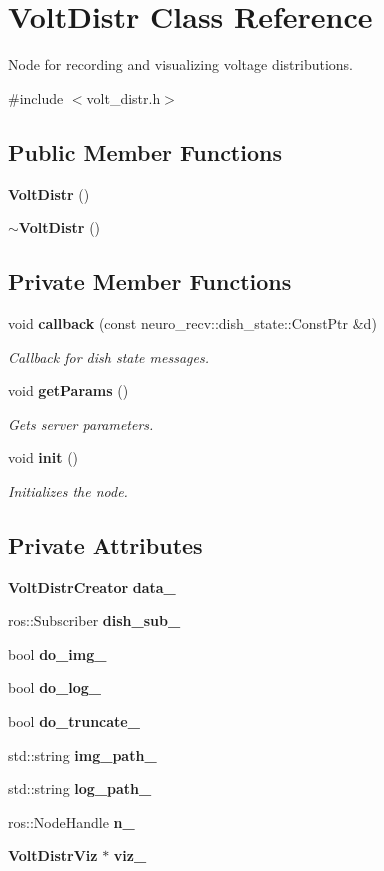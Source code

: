 \section{\-Volt\-Distr \-Class \-Reference}
\label{classVoltDistr}


\-Node for recording and visualizing voltage distributions.  




{\ttfamily \#include $<$volt\-\_\-distr.\-h$>$}

\subsection*{\-Public \-Member \-Functions}
\begin{DoxyCompactItemize}
\item 
{\bf \-Volt\-Distr} ()
\item 
{\bf $\sim$\-Volt\-Distr} ()
\end{DoxyCompactItemize}
\subsection*{\-Private \-Member \-Functions}
\begin{DoxyCompactItemize}
\item 
void {\bf callback} (const neuro\-\_\-recv\-::dish\-\_\-state\-::\-Const\-Ptr \&d)
\begin{DoxyCompactList}\small\item\em \-Callback for dish state messages. \end{DoxyCompactList}\item 
void {\bf get\-Params} ()
\begin{DoxyCompactList}\small\item\em \-Gets server parameters. \end{DoxyCompactList}\item 
void {\bf init} ()
\begin{DoxyCompactList}\small\item\em \-Initializes the node. \end{DoxyCompactList}\end{DoxyCompactItemize}
\subsection*{\-Private \-Attributes}
\begin{DoxyCompactItemize}
\item 
{\bf \-Volt\-Distr\-Creator} {\bf data\-\_\-}
\item 
ros\-::\-Subscriber {\bf dish\-\_\-sub\-\_\-}
\item 
bool {\bf do\-\_\-img\-\_\-}
\item 
bool {\bf do\-\_\-log\-\_\-}
\item 
bool {\bf do\-\_\-truncate\-\_\-}
\item 
std\-::string {\bf img\-\_\-path\-\_\-}
\item 
std\-::string {\bf log\-\_\-path\-\_\-}
\item 
ros\-::\-Node\-Handle {\bf n\-\_\-}
\item 
{\bf \-Volt\-Distr\-Viz} $\ast$ {\bf viz\-\_\-}
\end{DoxyCompactItemize}


